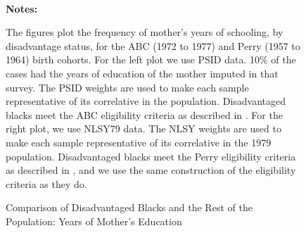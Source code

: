 \begin{figure} \begin{center}\centering
        \caption{Comparison of Disadvantaged Blacks and the Rest of the Population: Years of Mother's Education}
        \label{graph:abc_moedu_all}\vspace{0.2cm}
          \\
\end{center}
{\scriptsize {\bfseries Notes: } \raggedright 
The figures plot the frequency of mother's years of schooling, by disadvantage status, for the ABC (1972 to 1977) and Perry (1957 to 1964) birth cohorts. For the left plot we use PSID data. 10\% of the cases had the years of education of the mother imputed in that survey. The PSID weights are used to make each sample representative  of its correlative in the population. Disadvantaged blacks meet the  ABC eligibility criteria as described in \citet{Ramey_Smith_1977_AJMD}. For the right plot, we use NLSY79 data. The NLSY weights are used to make each sample representative  of its correlative in the 1979 population. Disadvantaged blacks meet the Perry eligibility criteria as described in \citet{heckman2010analyzing}, and we use the same construction of the eligibility criteria as they do.
}
\end{figure}
\restoregeometry

